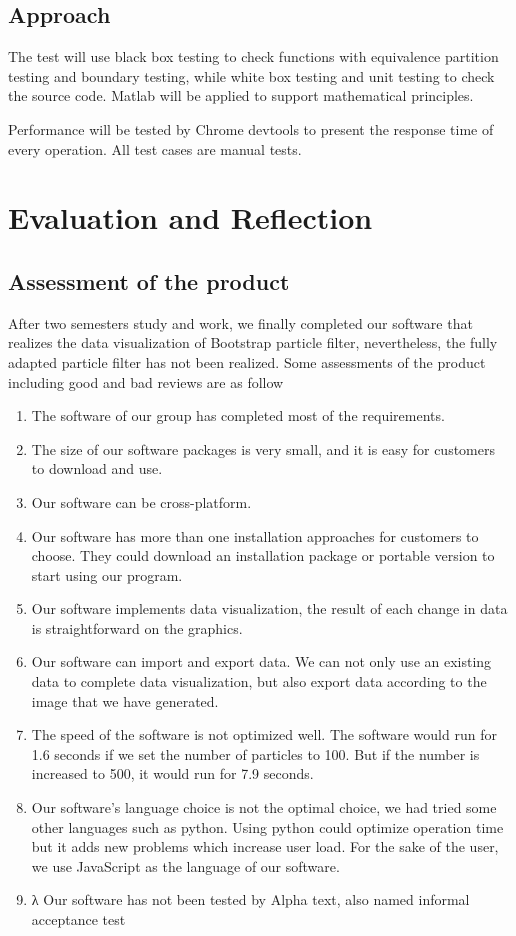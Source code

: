 \documentclass[11pt,oneside,a4paper]{article}
\begin{document}
\subsection{Approach}
The test will use black box testing to check functions with equivalence partition testing and boundary testing, while white box testing and unit testing to check the source code. Matlab will be applied to support mathematical principles.

Performance will be tested by Chrome devtools to present the response time of every operation. All test cases are manual tests.






\section{Evaluation and Reflection}
\subsection{Assessment of the product}
After two semesters\’ study and work, we finally completed our software that realizes the data visualization of Bootstrap particle filter, nevertheless, the fully adapted particle filter has not been realized. Some assessments of the product including good and bad reviews are as follow
\begin{enumerate}
  \item The software of our group has completed most of the requirements.
  \item The size of our software packages is very small, and it is easy for customers to download and use.
  \item Our software can be cross-platform.
  \item Our software has more than one installation approaches for customers to choose. They could download an installation package or portable version to start using our program.
  \item Our software implements data visualization, the result of each change in data is straightforward on the graphics.
  \item Our software can import and export data. We can not only use an existing data to complete data visualization, but also export data according to the image that we have generated.
  \item The speed of the software is not optimized well. The software would run for 1.6 seconds if we set the number of particles to 100. But if the number is increased to 500, it would run for 7.9 seconds.
  \item Our software’s language choice is not the optimal choice, we had tried some other languages such as python. Using python could optimize operation time but it adds new problems which increase user load. For the sake of the user, we use JavaScript as the language of our software.
  \item λ	Our software has not been tested by Alpha text, also named informal acceptance test
\end{enumerate}
\end{document}
